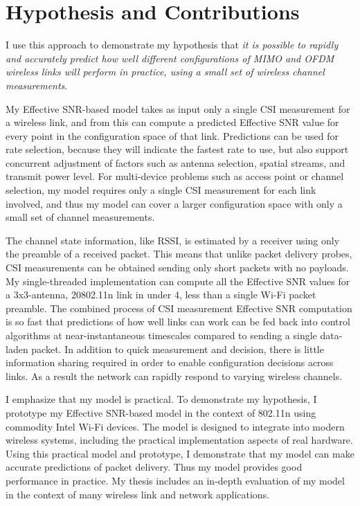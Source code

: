 \section{Hypothesis and Contributions}
I use this approach to demonstrate my hypothesis that \emph{it is possible to rapidly and accurately predict how well different configurations of MIMO and OFDM wireless links will perform in practice, using a small set of wireless channel measurements}.

My Effective SNR-based model takes as input only a single CSI measurement for a wireless link, and from this can compute a predicted Effective SNR value for every point in the configuration space of that link. Predictions can be used for rate selection, because they will indicate the fastest rate to use, but also support concurrent adjustment of factors such as antenna selection, spatial streams, and transmit power level. For multi-device problems such as access point or channel selection, my model requires only a single CSI measurement for each link involved, and thus my model can cover a larger configuration space with only a small set of channel measurements.

The channel state information, like RSSI, is estimated by a receiver using only the preamble of a received packet. This means that unlike packet delivery probes, CSI measurements can be obtained sending only short packets with no payloads. My single-threaded implementation can compute all the Effective SNR values for a 3x3-antenna, 20\MHz 802.11n link in under 4\us, less than a single Wi-Fi packet preamble. The combined process of CSI measurement Effective SNR computation is so fast that predictions of how well links can work can be fed back into control algorithms at near-instantaneous timescales compared to sending a single data-laden packet.
In addition to quick measurement and decision, there is little information sharing required in order to enable configuration decisions across links. As a result the network can rapidly respond to varying wireless channels.

I emphasize that my model is practical. To demonstrate my hypothesis, I prototype my Effective SNR-based model in the context of 802.11n using commodity Intel Wi-Fi devices. The model is designed to integrate into modern wireless systems, including the practical implementation aspects of real hardware. Using this practical model and prototype, I demonstrate that my model can make accurate predictions of packet delivery. Thus my model provides good performance in practice. My thesis includes an in-depth evaluation of my model in the context of many wireless link and network applications.

